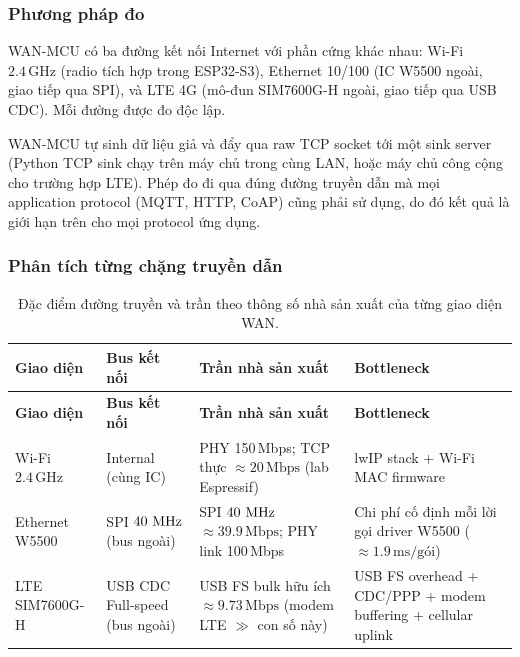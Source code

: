 \subsubsection{Phương pháp đo}

WAN-MCU có ba đường kết nối Internet với phần cứng khác nhau: Wi-Fi $2{.}4\,\text{GHz}$ (radio tích hợp trong ESP32-S3), Ethernet 10/100 (IC W5500 ngoài, giao tiếp qua SPI), và LTE 4G (mô-đun SIM7600G-H ngoài, giao tiếp qua USB CDC). Mỗi đường được đo độc lập.

WAN-MCU tự sinh dữ liệu giả và đẩy qua raw TCP socket tới một sink server (Python TCP sink chạy trên máy chủ trong cùng LAN, hoặc máy chủ công cộng cho trường hợp LTE). Phép đo đi qua đúng đường truyền dẫn mà mọi application protocol (MQTT, HTTP, CoAP) cũng phải sử dụng, do đó kết quả là giới hạn trên cho mọi protocol ứng dụng.

\subsubsection{Phân tích từng chặng truyền dẫn}

\begin{longtable}{|p{2.5cm}|p{2.5cm}|p{4.5cm}|p{4.5cm}|}
    \caption{Đặc điểm đường truyền và trần theo thông số nhà sản xuất của từng giao diện WAN.}
    \label{tab:wan_paths} \\
    \hline
    \textbf{Giao diện} & \textbf{Bus kết nối} & \textbf{Trần nhà sản xuất} & \textbf{Bottleneck} \\ \hline
    \endfirsthead
    \hline
    \textbf{Giao diện} & \textbf{Bus kết nối} & \textbf{Trần nhà sản xuất} & \textbf{Bottleneck} \\ \hline
    \endhead
    \hline
    \endfoot
    \endlastfoot
    Wi-Fi $2{.}4\,\text{GHz}$ & Internal (cùng IC) & PHY 150\,Mbps; TCP thực $\approx 20\,\text{Mbps}$ (lab Espressif) & lwIP stack + Wi-Fi MAC firmware \\ \hline
    Ethernet W5500 & SPI $40\,\text{\,MHz}$ (bus ngoài) & SPI $40\,\text{\,MHz}$ $\approx 39{.}9\,\text{Mbps}$; PHY link 100\,Mbps & Chi phí cố định mỗi lời gọi driver W5500 ($\approx 1{.}9\,\text{ms/gói}$) \\ \hline
    LTE SIM7600G-H & USB CDC Full-speed (bus ngoài) & USB FS bulk hữu ích $\approx 9{.}73\,\text{Mbps}$ (modem LTE $\gg$ con số này) & USB FS overhead + CDC/PPP + modem buffering + cellular uplink \\ \hline
\end{longtable}

